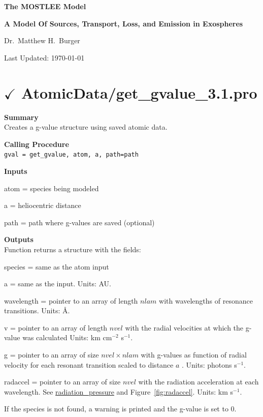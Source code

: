 \documentclass[11pt]{article}
\newcommand\descrip[1]{\textsf{\textbf{\large{#1}}}\\}
\begin{document}
\begin{center}
\Large \textbf{The MOSTLEE Model}

\large \textbf{A Model Of Sources, Transport, Loss, and Emission in Exospheres}

Dr.\ Matthew H.\ Burger
\end{center}
\normalsize

\vspace{2in}
Last Updated: \today

\clearpage

\tableofcontents
\listoftables
\listoffigures
\clearpage

\section{$\checkmark$ AtomicData/get\_gvalue\_3.1.pro} \label{sec:get_gvalue}

\descrip{Summary}
Creates a g-value structure using saved atomic data.

\descrip{Calling Procedure}
\verb+gval = get_gvalue, atom, a, path=path+

\descrip{Inputs}
\begin{compactenum} \listup
\item atom = species being modeled
\item a = heliocentric distance
\item path = path where g-values are saved (optional)
\end{compactenum}

\descrip{Outputs}
Function returns a structure with the fields:
\begin{compactitem}
\item species = same as the atom input
\item a = same as the input. Units: AU.
\item wavelength = pointer to an array of length $nlam$ with wavelengths of 
resonance transitions. Units: \AA.
\item v = pointer to an array of length $nvel$ with the radial velocities at 
which the g-value was calculated Units: km cm$^{-2}$ s$^{-1}$.
\item g = pointer to an array of size $nvel \times nlam$ with g-values as
function of radial velocity for each resonant transition scaled to distance 
$a$ . Units: photons s$^{-1}$. 
\item radaccel = pointer to an array of size $nvel$ with the radiation 
acceleration at each wavelength. See
\hyperref[sec:radiation_pressure]{radiation\_pressure} and
Figure~\ref{fig:radaccel}. Units: km s$^{-1}$.
\item If the species is not found, a warning is printed and the g-value is set
to 0.
\end{compactitem}
\end{document}
